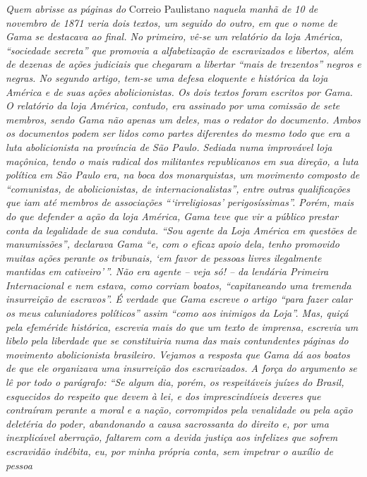 \begin{argumento}
\emph{Quem abrisse as páginas do} Correio Paulistano \emph{naquela manhã
de 10 de novembro de 1871 veria dois textos, um seguido do outro, em que
o nome de Gama se destacava ao final. No primeiro, vê-se um relatório da
loja América, ``sociedade secreta'' que promovia a alfabetização de
escravizados e libertos, além de dezenas de ações judiciais que chegaram
a libertar ``mais de trezentos'' negros e negras. No segundo artigo,
tem-se uma defesa eloquente e histórica da loja América e de suas ações
abolicionistas. Os dois textos foram escritos por Gama. O relatório da
loja América, contudo, era assinado por uma comissão de sete membros,
sendo Gama não apenas um deles, mas o redator do documento. Ambos os
documentos podem ser lidos como partes diferentes do mesmo todo que era
a luta abolicionista na província de São Paulo. Sediada numa improvável
loja maçônica, tendo o mais radical dos militantes republicanos em sua
direção, a luta política em São Paulo era, na boca dos monarquistas, um
movimento composto de ``comunistas, de abolicionistas, de
internacionalistas'', entre outras qualificações que iam até membros de
associações ```irreligiosas' perigosíssimas''. Porém, mais do que defender
a ação da loja América, Gama teve que vir a público prestar conta da
legalidade de sua conduta. ``Sou agente da Loja América em questões de
manumissões'', declarava Gama ``e, com o eficaz apoio dela, tenho
promovido muitas ações perante os tribunais, `em favor de pessoas livres
ilegalmente mantidas em cativeiro'\,''. Não era agente -- veja só! -- da
lendária Primeira Internacional e nem estava, como corriam boatos,
``capitaneando uma tremenda insurreição de escravos''. É verdade que Gama
escreve o artigo ``para fazer calar os meus caluniadores políticos'' assim
``como aos inimigos da Loja''. Mas, quiçá pela efeméride histórica,
escrevia mais do que um texto de imprensa, escrevia um libelo pela
liberdade que se constituiria numa das mais contundentes páginas do
movimento abolicionista brasileiro. Vejamos a resposta que Gama dá aos
boatos de que ele organizava uma insurreição dos escravizados. A força
do argumento se lê por todo o parágrafo: ``Se algum dia, porém, os
respeitáveis juízes do Brasil, esquecidos do respeito que devem à lei, e
dos imprescindíveis deveres que contraíram perante a moral e a nação,
corrompidos pela venalidade ou pela ação deletéria do poder, abandonando
a causa sacrossanta do direito e, por uma inexplicável aberração,
faltarem com a devida justiça aos infelizes que sofrem escravidão
indébita, eu, por minha própria conta, sem impetrar o auxílio de pessoa
}
\end{argumento}
